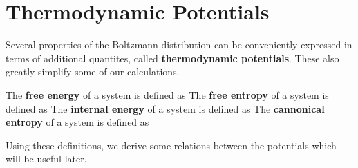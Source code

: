 \documentclass[letterpaper,english,10pt]{article}
\begin{document}
\section{Thermodynamic Potentials}
Several properties of the Boltzmann distribution can be conveniently expressed in terms of additional quantites, called \textbf{thermodynamic potentials}. These also greatly simplify some of our calculations. 

\begin{defn}
The \textbf{free energy} of a system is defined as 
The \textbf{free entropy} of a system is defined as 
The \textbf{internal energy} of a system is defined as 
The \textbf{cannonical entropy} of a system is defined as 
\end{defn}
Using these definitions, we derive some relations between the potentials which will be useful later. 
\end{document}
